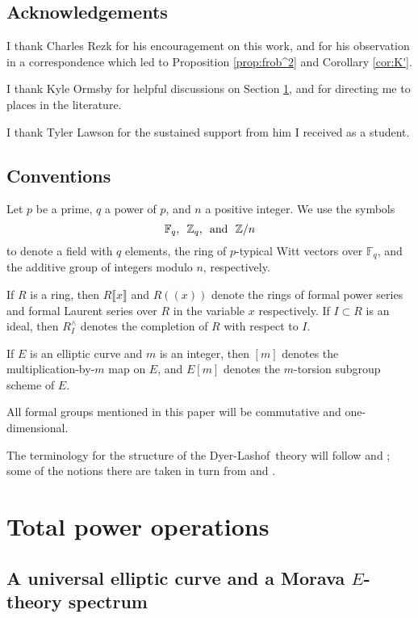 \documentclass{gtpart}
\theoremstyle{definition}
\theoremstyle{remark}
\newcommand{\mb}[1]{\mathbb{#1}}
\newcommand{\DL}{Dyer-Lashof~}
\newcommand{\BF}{{\mb F}}
\newcommand{\BZ}{{\mb Z}}
\newcommand{\ad}{{\rm and}}
\begin{document}
\subsection{Acknowledgements}

I thank Charles Rezk for his encouragement on this work, and for his 
observation in a correspondence which led to Proposition 
\ref{prop:frob^2} and Corollary \ref{cor:K'}.  

I thank Kyle Ormsby for helpful discussions on Section \ref{sec:total}, 
and for directing me to places in the literature.  

I thank Tyler Lawson for the sustained support from him I received as a 
student.  


\subsection{Conventions}

Let $p$ be a prime, $q$ a power of $p$, and $n$ a positive integer.  We 
use the symbols 
\[
 \BF_q\text{,}~~\BZ_q\text{,}~~\ad~~\BZ/n 
\]
to denote a field with $q$ elements, the ring of $p$-typical Witt 
vectors over $\BF_q$, and the additive group of integers modulo $n$, 
respectively.  

If $R$ is a ring, then $R\llbracket x \rrbracket$ and $R (\!(x)\!)$ 
denote the rings of formal power series and formal Laurent series over 
$R$ in the variable $x$ respectively.  If $I \subset R$ is an ideal, 
then $R_I^\wedge$ denotes the completion of $R$ with respect to $I$.  

If $E$ is an elliptic curve and $m$ is an integer, then $[m]$ denotes 
the multiplication-by-$m$ map on $E$, and $E[m]$ denotes the $m$-torsion 
subgroup scheme of $E$.  

All formal groups mentioned in this paper will be commutative and 
one-dimensional.  

The terminology for the structure of the \DL theory will follow 
\cite{cong} and \cite{h2p2}; some of the notions there are taken in turn 
from \cite{BW} and \cite{V}.  


\section{Total power operations}
\label{sec:total}

\subsection{A universal elliptic curve and a Morava $E$-theory spectrum}
\label{subsec:ec}
\end{document}
